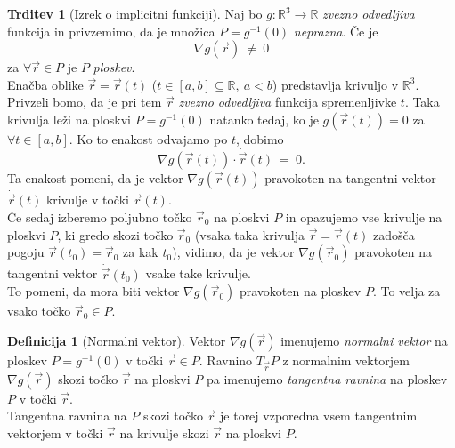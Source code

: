 \documentclass[11pt]{article}
\theoremstyle{definition}
\newtheorem{definicija}{Definicija}[section]
\theoremstyle{definition}
\newtheorem{trditev}{Trditev}[section]
\theoremstyle{definition}
\begin{document}
\begin{trditev}[Izrek o implicitni funkciji]

Naj bo $g: \mathbb{R}^3 \rightarrow \mathbb{R}$ \textit{zvezno odvedljiva} funkcija in privzemimo, da je množica $P = g^{-1}(0)$ \textit{neprazna}. Če je
$$\nabla g(\vec{r}) ~\neq~ 0$$
za $\forall \vec{r} \in P$ je $P$ \textit{ploskev}. \\

Enačba oblike $\vec{r} = \vec{r}(t)$ ($t \in [a, b] \subseteq \mathbb{R}, ~a < b$) predstavlja krivuljo v $\mathbb{R}^3$. Privzeli bomo, da je pri tem $\vec{r}$ \textit{zvezno odvedljiva} funkcija spremenljivke $t$. Taka krivulja leži na ploskvi $P = g^{-1}(0)$ natanko tedaj, ko je $g(\vec{r}(t)) = 0$ za $\forall t \in [a, b]$. Ko to enakost odvajamo po $t$, dobimo
$$\nabla g(\vec{r}(t)) \cdot \dot{\vec{r}}(t) ~=~ 0.$$
Ta enakost pomeni, da je vektor $\nabla g(\vec{r}(t))$ pravokoten na tangentni vektor $\dot{\vec{r}}(t)$ krivulje v točki $\vec{r}(t)$. \\

Če sedaj izberemo poljubno točko $\vec{r}_0$ na ploskvi $P$ in opazujemo vse krivulje na ploskvi $P$, ki gredo skozi točko $\vec{r}_0$ (vsaka taka krivulja $\vec{r} = \vec{r}(t)$ zadošča pogoju $\vec{r}(t_0) = \vec{r}_0$ za kak $t_0$), vidimo, da je vektor $\nabla g(\vec{r}_0)$ pravokoten na tangentni vektor $\dot{\vec{r}}(t_0)$ vsake take krivulje. \\

To pomeni, da mora biti vektor $\nabla g(\vec{r}_0)$ pravokoten na ploskev $P$. To velja za vsako točko $\vec{r}_0 \in P$.
 

\end{trditev}
\vspace{0.5cm}

\begin{definicija}[Normalni vektor]

Vektor $\nabla g(\vec{r})$ imenujemo \textit{normalni vektor} na ploskev $P = g^{-1}(0)$ v točki $\vec{r} \in P$. Ravnino $T_{\vec{r}}P$ z normalnim vektorjem $\nabla g(\vec{r})$ skozi točko $\vec{r}$ na ploskvi $P$ pa imenujemo \textit{tangentna ravnina} na ploskev $P$ v točki $\vec{r}$. \\

Tangentna ravnina na $P$ skozi točko $\vec{r}$ je torej vzporedna vsem tangentnim vektorjem v točki $\vec{r}$ na krivulje skozi $\vec{r}$ na ploskvi $P$.

\end{definicija}
\vspace{0.5cm}
\end{document}
